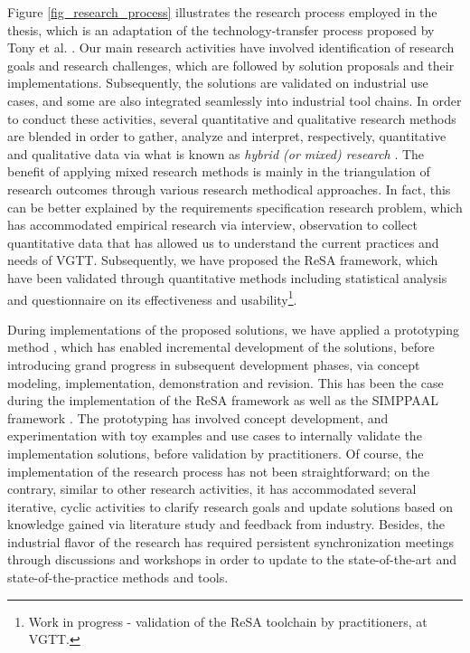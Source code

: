 Figure \ref{fig_research_process} illustrates the research process employed in the thesis, which is an adaptation of the technology-transfer process proposed by Tony et al. \cite{Gorschek2006APractice}. Our main research activities have involved identification of research goals and research challenges, which are followed by solution proposals and their implementations. Subsequently, the solutions are validated on industrial use cases, and some are also integrated seamlessly into industrial tool chains. In order to conduct these activities, several quantitative and qualitative research methods are blended in order to gather, analyze and interpret, respectively, quantitative and qualitative data via what is known as \textit{hybrid (or mixed) research} \cite{Creswell2014ResearchApproaches}. The benefit of applying mixed research methods is mainly in the triangulation of research outcomes through various research methodical approaches. In fact, this can be better explained by the requirements specification research problem, which has accommodated empirical research via interview, observation to collect quantitative data that has allowed us to understand the current practices and needs of VGTT. Subsequently, we have proposed the ReSA framework, which have been validated through quantitative methods including statistical analysis and questionnaire on its effectiveness and usability\footnote{Work in progress - validation of the ReSA toolchain by practitioners, at VGTT.}.

During implementations of the proposed solutions, we have applied a prototyping method \cite{Carr2004PrototypingApproaches}, which has enabled incremental development of the solutions, before introducing grand progress in subsequent development phases, via concept modeling, implementation, demonstration and revision. This has been the case during the implementation of the ReSA framework \cite{resatool,Mahmud2017SpecificationLogic} as well as the SIMPPAAL framework \cite{Filipovikj2016SimulinkSystems}. The prototyping has involved concept development, and experimentation with toy examples and use cases to internally validate the implementation solutions, before validation by practitioners. Of course, the implementation of the research process has not been straightforward; on the contrary, similar to other research activities, it has accommodated several iterative, cyclic activities to clarify research goals and update solutions based on knowledge gained via literature study and feedback from industry.  Besides, the industrial flavor of the research has required persistent synchronization meetings through discussions and workshops in order to update to the state-of-the-art and state-of-the-practice methods and tools.


